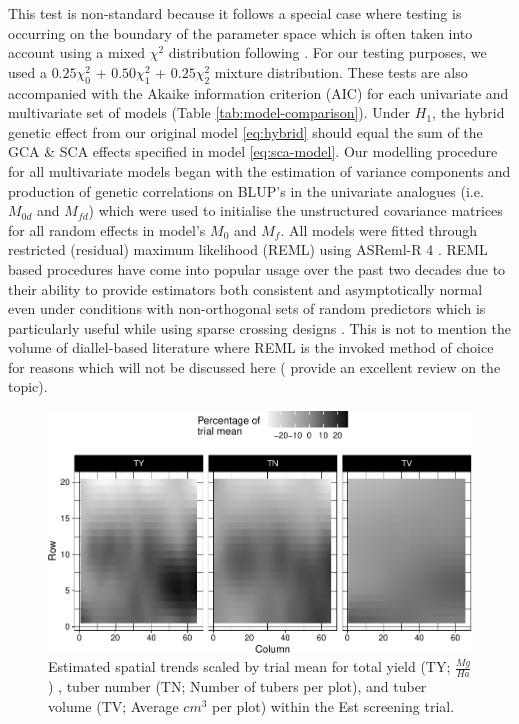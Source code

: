 This test is non-standard because it follows a special case where testing is occurring on the boundary of the parameter space which is often taken into account using a mixed \(\chi^2\) distribution following \citep{Self1987}. For our testing purposes, we used a \(0.25\chi^2_0\) + \(0.50\chi^2_1\) + \(0.25\chi^2_2\) mixture distribution. These tests are also accompanied with the Akaike information criterion (AIC) for each univariate and multivariate set of models (Table \ref{tab:model-comparison}). Under \(H_1\), the hybrid genetic effect from our original model \eqref{eq:hybrid} should equal the sum of the GCA \& SCA effects specified in model \eqref{eq:sca-model}. Our modelling procedure for all multivariate models began with the estimation of variance components and production of genetic correlations on BLUP's in the univariate analogues (i.e.~\(M_{0d}\) and \(M_{fd}\)) which were used to initialise the unstructured covariance matrices for all random effects in model's \(M_0\) and \(M_f\). All models were fitted through restricted (residual) maximum likelihood (REML) using ASReml-R 4 \citep{Butler2017}. REML based procedures have come into popular usage over the past two decades due to their ability to provide estimators both consistent and asymptotically normal even under conditions with non-orthogonal sets of random predictors which is particularly useful while using sparse crossing designs \citep{Searle1992}. This is not to mention the volume of diallel-based literature where REML is the invoked method of choice for reasons which will not be discussed here (\citep{Mohring2011} provide an excellent review on the topic).

\begin{figure}
\centering
\includegraphics[width=\linewidth]{./figs_02/Fig1.pdf}
\caption{\label{fig:trend-est}Estimated spatial trends scaled by trial mean for total yield (TY; \(\frac{Mg}{Ha}\)) , tuber number (TN; Number of tubers per plot), and tuber volume (TV; Average \(cm^3\) per plot) within the Est screening trial.}
\end{figure}


